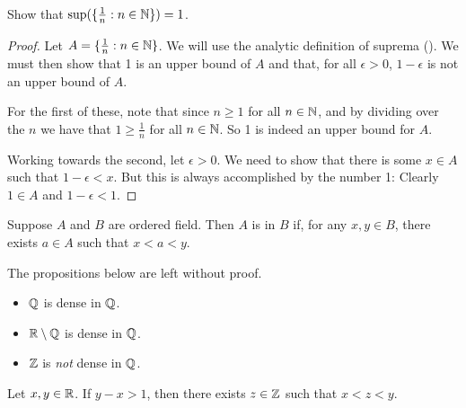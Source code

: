 \documentclass[11pt,twoside=off,numbers=noenddot]{scrbook}
\begin{document}
\begin{example}
    Show that $\sup(\{ \frac{1}{n} : n \in \mathbb N \}) = 1$.
    \begin{proof}
        Let $A = \{ \frac{1}{n} : n \in \mathbb N \}$. We will use the analytic definition of suprema (). We must then show that 1 is an upper bound of $A$ and that, for all $\epsilon > 0$, $1 - \epsilon$ is not an upper bound of $A$.

        For the first of these, note that since $n \geq 1$ for all $n \in \mathbb N$, and by dividing over the $n$ we have that $1 \geq \frac{1}{n}$ for all $n \in \mathbb N$. So 1 is indeed an upper bound for $A$.

        Working towards the second, let $\epsilon > 0$. We need to show that there is some $x \in A$ such that $1 - \epsilon < x$. But this is always accomplished by the number 1: Clearly $1 \in A$ and $1 - \epsilon < 1$.
    \end{proof}
\end{example}

\begin{definition}[Density]
    Suppose $A$ and $B$ are ordered field. Then $A$ is  in $B$ if, for any $x, y \in B$, there exists $a \in A$ such that $x < a < y$.
\end{definition}

\begin{example}
    The propositions below are left without proof.
    \begin{itemize}
        \item $\mathbb Q$ is dense in $\mathbb Q$.
        \item $\mathbb R \setminus \mathbb Q$ is dense in $\mathbb Q$.
        \item $\mathbb Z$ is \textit{not} dense in $\mathbb Q$.
    \end{itemize}
\end{example}

\begin{lemma}
    Let $x, y \in \mathbb R$. If $y - x > 1$, then there exists $z \in \mathbb Z$ such that $x < z < y$.
\end{lemma}
\end{document}
